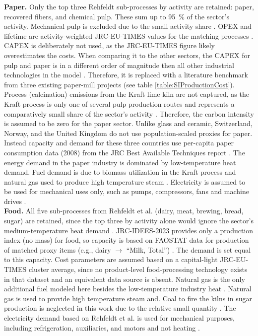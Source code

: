 \textbf{Paper.} Only the top three Rehfeldt sub-processes by activity are retained: paper, recovered fibers, and chemical pulp. These sum up to 95~\% of the sector's activity. Mechanical pulp is excluded due to the small activity share \cite{Rehfeldt2017}. \Ac{OPEX} and lifetime are activity-weighted JRC-EU-TIMES values for the matching processes \cite{JRCEUTIMES2013}. \Ac{CAPEX} is deliberately not used, as the JRC-EU-TIMES figure likely overestimates the costs. When comparing it to the other sectors, the CAPEX for pulp and paper is in a different order of magnitude then all other industrial technologies in the model \cite{JRCEUTIMES2013}. Therefore, it is replaced with a literature benchmark from three existing paper-mill projects \cite{StoraEnso2026,StoraEnso2022,AsiaPaper2016} (see table \ref{table:SIProductionCost}). Process (calcination)  emissions from the Kraft lime kiln are not captured,  as the Kraft process is only one of several pulp production routes and represents a comparatively small share of the sector's activity \cite{Rehfeldt2017}. Therefore, the carbon intensity is assumed to be zero for the paper sector. Unlike glass and ceramic, Switzerland, Norway, and the United Kingdom do not use population-scaled proxies for paper. Instead capacity and demand for these three countries use per-capita paper consumption data (2008) from the JRC Best Available Techniques report \cite{JRC_BAT_Paper2015}. The energy demand in the paper industry is dominated by low-temperature heat demand. Fuel demand is due to biomass utilization in the Kraft process and natural gas used to produce high temperature steam \cite{Rehfeldt2017}. Electricity is assumed to be used for mechanical uses only, such as pumps, compressors, fans and machine drives \cite{Marina2020}. \\

\textbf{Food.} All five sub-processes from Rehfeldt et al. (dairy, meat, brewing, bread, sugar) are retained, since the top three by activity alone would ignore the sector's medium-temperature heat demand \cite{Rehfeldt2017}. JRC-IDEES-2023 \cite{JRC2023} provides only a production index (no mass) for food, so capacity is based on FAOSTAT data for production of matched proxy items (e.g., dairy $\to$ ``Milk, Total'') \cite{FAOSTAT2026}. The demand is set equal to this capacity. Cost parameters are assumed based on a capital-light JRC-EU-TIMES cluster average, since no product-level food-processing technology exists in that dataset \cite{JRCEUTIMES2013} and an equivalent data source is absent. Natural gas is the only additional fuel modeled here besides the low-temperature industry heat \cite{Marina2020, Rehfeldt2017}. Natural gas is used to provide high temperature steam and. Coal to fire the kilns in sugar production is neglected in this work due to the relative small quantity \cite{Asadi2022}. The electricity demand based on Rehfeldt et al. is used for mechanical purposes, including refrigeration, auxiliaries, and motors and not heating \cite{Rehfeldt2017}. \\

